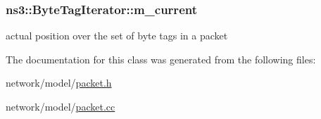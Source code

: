 \subsubsection[{\texorpdfstring{m\+\_\+current}{m_current}}]{ ns3\+::\+Byte\+Tag\+Iterator\+::m\+\_\+current\hspace{0.3cm}{\ttfamily [private]}}\hypertarget{classns3_1_1ByteTagIterator_af270ce56fb3f7f04082645de35fa7dc6}{}\label{classns3_1_1ByteTagIterator_af270ce56fb3f7f04082645de35fa7dc6}


actual position over the set of byte tags in a packet 



The documentation for this class was generated from the following files\+:\begin{DoxyCompactItemize}
\item 
network/model/\hyperlink{packet_8h}{packet.\+h}\item 
network/model/\hyperlink{packet_8cc}{packet.\+cc}\end{DoxyCompactItemize}
